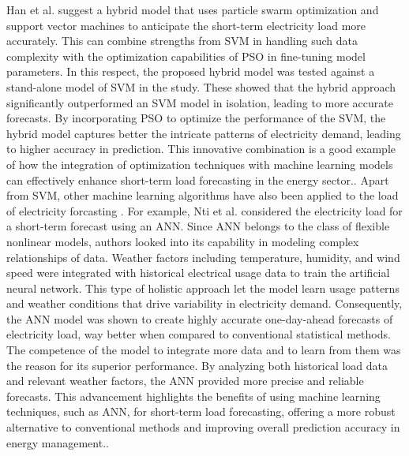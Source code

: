 \documentclass[12pt, a4paper,twoside]{report}
\theoremstyle{plain} %
\theoremstyle{definition} %
\theoremstyle{remark} %
\numberwithin{equation}{chapter}
\begin{document}
Han et al. suggest a hybrid model that uses particle swarm optimization and support vector machines to anticipate the short-term electricity load more accurately. This can combine strengths from SVM in handling such data complexity with the optimization capabilities of PSO in fine-tuning model parameters. In this respect, the proposed hybrid model was tested against a stand-alone model of SVM in the study. These showed that the hybrid approach significantly outperformed an SVM model in isolation, leading to more accurate forecasts. By incorporating PSO to optimize the performance of the SVM, the hybrid model captures better the intricate patterns of electricity demand, leading to higher accuracy in prediction. This innovative combination is a good example of how the integration of optimization techniques with machine learning models can effectively enhance short-term load forecasting in the energy sector.\cite{nti2020electricity}\cite{ma2020short}.
Apart from SVM, other machine learning algorithms have also been applied to the load of electricity forcasting \cite{wang2023comparative}. For example, Nti et al. considered the electricity load for a short-term forecast using an ANN. Since ANN belongs to the class of flexible nonlinear models, authors looked into its capability in modeling complex relationships of data. Weather factors including temperature, humidity, and wind speed were integrated with historical electrical usage data to train the artificial neural network. This type of holistic approach let the model learn usage patterns and weather conditions that drive variability in electricity demand. Consequently, the ANN model was shown to create highly accurate one-day-ahead forecasts of electricity load, way better when compared to conventional statistical methods. The competence of the model to integrate more data and to learn from them was the reason for its superior performance. By analyzing both historical load data and relevant weather factors, the ANN provided more precise and reliable forecasts. This advancement highlights the benefits of using machine learning techniques, such as ANN, for short-term load forecasting, offering a more robust alternative to conventional methods and improving overall prediction accuracy in energy management.\cite{nti2020electricity}.

\newline
\end{document}
